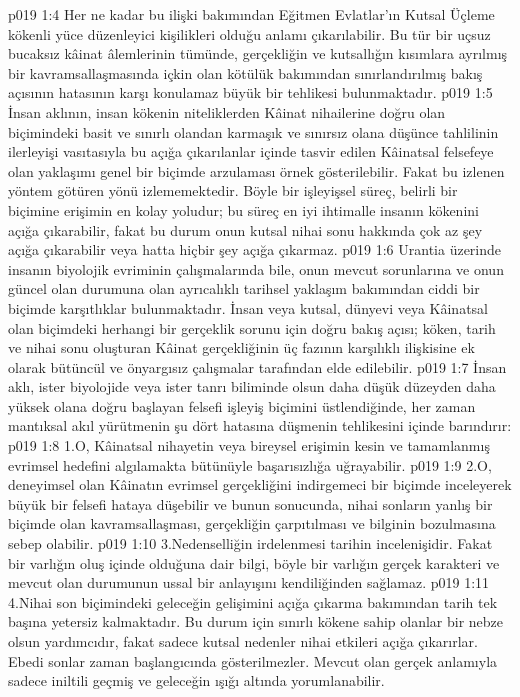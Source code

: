 \vs p019 1:4 Her ne kadar bu ilişki bakımından Eğitmen Evlatlar’ın Kutsal Üçleme kökenli yüce düzenleyici kişilikleri olduğu anlamı çıkarılabilir. Bu tür bir uçsuz bucaksız kâinat âlemlerinin tümünde, gerçekliğin ve kutsallığın kısımlara ayrılmış bir kavramsallaşmasında içkin olan kötülük bakımından sınırlandırılmış bakış açısının hatasının karşı konulamaz büyük bir tehlikesi bulunmaktadır.
\vs p019 1:5 İnsan aklının, insan kökenin niteliklerden Kâinat nihailerine doğru olan biçimindeki basit ve sınırlı olandan karmaşık ve sınırsız olana düşünce tahlilinin ilerleyişi vasıtasıyla bu açığa çıkarılanlar içinde tasvir edilen Kâinatsal felsefeye olan yaklaşımı genel bir biçimde arzulaması örnek gösterilebilir. Fakat bu izlenen yöntem  götüren yönü izlememektedir. Böyle bir işleyişsel süreç,  belirli bir biçimine erişimin en kolay yoludur; bu süreç en iyi ihtimalle insanın kökenini açığa çıkarabilir, fakat bu durum onun kutsal nihai sonu hakkında çok az şey açığa çıkarabilir veya hatta hiçbir şey açığa çıkarmaz.
\vs p019 1:6 Urantia üzerinde insanın biyolojik evriminin çalışmalarında bile, onun mevcut sorunlarına ve onun güncel olan durumuna olan ayrıcalıklı tarihsel yaklaşım bakımından ciddi bir biçimde karşıtlıklar bulunmaktadır. İnsan veya kutsal, dünyevi veya Kâinatsal olan biçimdeki herhangi bir gerçeklik sorunu için doğru bakış açısı; köken, tarih ve nihai sonu oluşturan Kâinat gerçekliğinin üç fazının karşılıklı ilişkisine ek olarak bütüncül ve önyargısız çalışmalar tarafından elde edilebilir.
\vs p019 1:7 İnsan aklı, ister biyolojide veya ister tanrı biliminde olsun daha düşük düzeyden daha yüksek olana doğru başlayan felsefi işleyiş biçimini üstlendiğinde, her zaman mantıksal akıl yürütmenin şu dört hatasına düşmenin tehlikesini içinde barındırır:
\vs p019 1:8 1.\bibnobreakspace O, Kâinatsal nihayetin veya bireysel erişimin kesin ve tamamlanmış evrimsel hedefini algılamakta bütünüyle başarısızlığa uğrayabilir.
\vs p019 1:9 2.\bibnobreakspace O, deneyimsel olan Kâinatın evrimsel gerçekliğini indirgemeci bir biçimde inceleyerek büyük bir felsefi hataya düşebilir ve bunun sonucunda, nihai sonların yanlış bir biçimde olan kavramsallaşması, gerçekliğin çarpıtılması ve bilginin bozulmasına sebep olabilir.
\vs p019 1:10 3.\bibnobreakspace Nedenselliğin irdelenmesi tarihin incelenişidir. Fakat bir varlığın  oluş içinde olduğuna dair bilgi, böyle bir varlığın gerçek karakteri ve mevcut olan durumunun ussal bir anlayışını kendiliğinden sağlamaz.
\vs p019 1:11 4.\bibnobreakspace Nihai son biçimindeki geleceğin gelişimini açığa çıkarma bakımından tarih tek başına yetersiz kalmaktadır. Bu durum için sınırlı kökene sahip olanlar bir nebze olsun yardımcıdır, fakat sadece kutsal nedenler nihai etkileri açığa çıkarırlar. Ebedi sonlar zaman başlangıcında gösterilmezler. Mevcut olan gerçek anlamıyla sadece iniltili geçmiş ve geleceğin ışığı altında yorumlanabilir.
